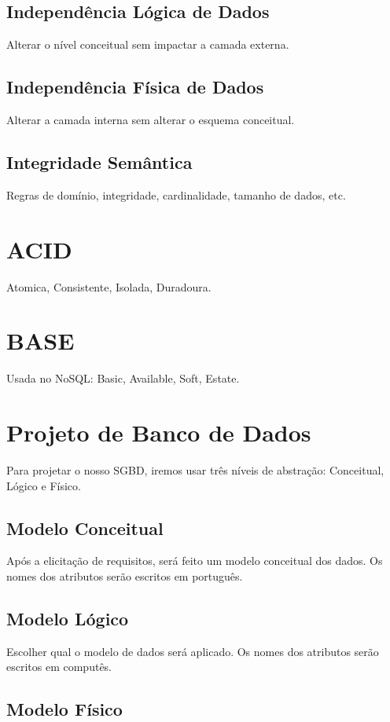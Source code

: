 \documentclass[ ]{article}
\begin{document}
		\subsection{Independência Lógica de Dados}
			Alterar o nível conceitual sem impactar a camada externa.
		\subsection{Independência Física de Dados}
			Alterar a camada interna sem alterar o esquema conceitual.
		\subsection{Integridade Semântica}
			Regras de domínio, integridade, cardinalidade, tamanho de dados, etc. 
	\section{ACID}
		Atomica, Consistente, Isolada, Duradoura.
	\section{BASE}
		Usada no NoSQL: Basic, Available, Soft, Estate.
	\section{Projeto de Banco de Dados}
		Para projetar o nosso SGBD, iremos usar três níveis de abstração: Conceitual, Lógico e Físico.
		\subsection{Modelo Conceitual}
			Após a elicitação de requisitos, será feito um modelo conceitual dos dados. Os nomes dos atributos serão escritos em português.
		\subsection{Modelo Lógico}
			Escolher qual o modelo de dados  será aplicado. Os nomes dos atributos serão escritos em computês.
		\subsection{Modelo Físico}
		
			
\end{document}
